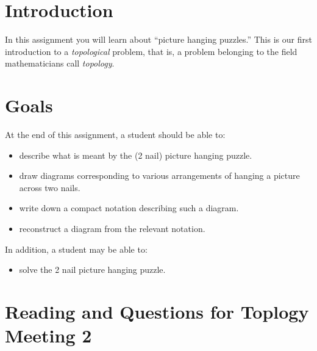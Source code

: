 \documentclass[12pt,letterpaper]{article}
\theoremstyle{definition}
\begin{document}
\setlength{\parskip}{1ex plus 0.5ex minus 0.2ex}
\setlength{\parindent}{0pt}

\pagestyle{fancy}
\cfoot{} 

\section*{Introduction}
In this assignment you will learn about ``picture hanging puzzles.''
This is our first introduction to a \emph{topological} problem, that is, a problem belonging to the field mathematicians call \emph{topology}.

\section*{Goals}
At the end of this assignment, a student should be able to:
\begin{itemize}
\item describe what is meant by the (2 nail) picture hanging puzzle.
\item draw diagrams corresponding to various arrangements of hanging a picture across two nails.
\item write down a compact notation describing such a diagram.
\item reconstruct a diagram from the relevant notation.
\end{itemize}
In addition, a student may be able to:
\begin{itemize}
\item solve the 2 nail picture hanging puzzle.
\end{itemize}

\section*{Reading and Questions for Toplogy Meeting 2}
\end{document}
